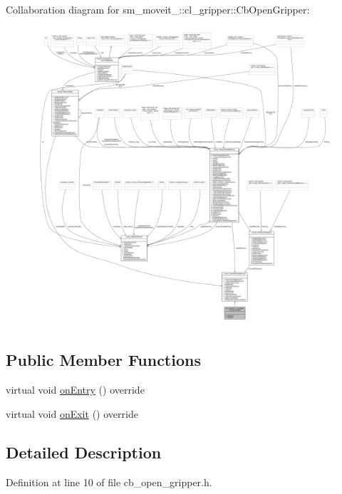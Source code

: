 Collaboration diagram for sm\+\_\+moveit\+\_\+:\+:cl\+\_\+gripper\+:\+:Cb\+Open\+Gripper\+:
\nopagebreak
\begin{figure}[H]
\begin{center}
\leavevmode
\includegraphics[width=350pt]{classsm__moveit__2_1_1cl__gripper_1_1CbOpenGripper__coll__graph}
\end{center}
\end{figure}
\subsection*{Public Member Functions}
\begin{DoxyCompactItemize}
\item 
virtual void \hyperlink{classsm__moveit__2_1_1cl__gripper_1_1CbOpenGripper_aaa18f60580c10e891b572f61f85ffb05}{on\+Entry} () override
\item 
virtual void \hyperlink{classsm__moveit__2_1_1cl__gripper_1_1CbOpenGripper_ab72fa9429628aa78b2bb1276ff7d390a}{on\+Exit} () override
\end{DoxyCompactItemize}


\subsection{Detailed Description}


Definition at line 10 of file cb\+\_\+open\+\_\+gripper.\+h.



